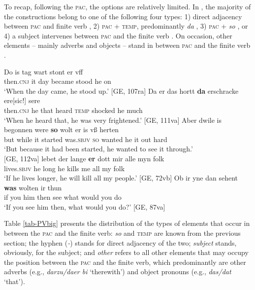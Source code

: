 \documentclass[output=paper,colorlinks,citecolor=brown]{langscibook}
\begin{document}
To recap, following the \textsc{pac}, the options are relatively limited. In , the majority of the constructions belong to one of the following four types: 1) direct adjacency between \textsc{pac} and finite verb , 2) \textsc{pac} + \textsc{temp}, predominantly \textit{da} , 3) \textsc{pac} + \textit{so} , or 4) a subject intervenes between \textsc{pac} and the finite verb . On occasion, other elements -- mainly adverbs and objects -- stand in between \textsc{pac} and the finite verb .

\ea
\ea \label{ex:int}
\gll Do is tag wart stont er vff \\
then.\textsc{cnj} it day became stood he on\\
\glt `When the day came, he stood up.' \hfill [GE, 107ra]
\ex \label{ex:da}
\gll Da er das hortt \textbf{da} erschracke ere[sic!] sere \\
then.\textsc{cnj} he that heard \textsc{temp} shocked he much\\
\glt `When he heard that, he was very frightened.' \hfill [GE, 111va]
\ex \label{ex:so2}
\gll Aber dwile is begonnen were \textbf{so} wolt er is vß herten \\
but while it started was.\textsc{sbjv} \textsc{so} wanted he it out hard\\
\glt `But because it had been started, he wanted to see it through.'\\ \hfill [GE, 112va]
\ex \label{ex:subj}
\gll lebet der lange \textbf{er} dott mir alle myn folk \\
lives.\textsc{sbjv} he long he kills me all my folk\\
\glt `If he lives longer, he will kill all my people.' \hfill [GE, 72vb]
\ex \label{ex:oth}
\gll Ob ir yne dan sehent \textbf{was} wolten ir thun\\
if you him then see what would you do\\
\glt `If you see him then, what would you do?' \hfill [GE, 87va]
\z
\z

Table \ref{tab-PVbig} presents the distribution of the types of elements that occur in between the \textsc{pac} and the finite verb: \textit{so} and \textsc{temp} are known from the previous section; the hyphen (\textit{-}) stands for direct adjacency of the two; \textit{subject} stands, obviously, for the subject; and \textit{other} refers to all other elements that may occupy the position between the \textsc{pac} and the finite verb, which predominantly are other adverbs (e.g., \textit{darzu/daer bi} `therewith') and object pronouns (e.g., \textit{das/dat} `that').
 
\end{document}
